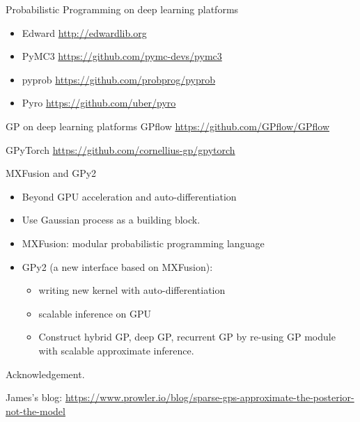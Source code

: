 \documentclass[14pt,aspectratio=1610]{beamer}
\begin{document}
\begin{frame}{Probabilistic Programming on deep learning platforms}

\begin{itemize}
\item Edward \url{http://edwardlib.org}
\item PyMC3 \url{https://github.com/pymc-devs/pymc3}
\item pyprob \url{https://github.com/probprog/pyprob}
\item Pyro \url{https://github.com/uber/pyro}
\end{itemize}

\end{frame}

\begin{frame}{GP on deep learning platforms}
GPflow \url{https://github.com/GPflow/GPflow}

GPyTorch \url{https://github.com/cornellius-gp/gpytorch}
\end{frame}



\begin{frame}{MXFusion and GPy2}
\begin{itemize}
\item Beyond GPU acceleration and auto-differentiation
\item Use Gaussian process as a building block.
\item MXFusion: modular probabilistic programming language 
\item GPy2 (a new interface based on MXFusion): 
\begin{itemize}
\item writing new kernel with auto-differentiation
\item scalable inference on GPU
\item Construct hybrid GP, deep GP, recurrent GP by re-using GP module with scalable approximate inference.
\end{itemize}
\end{itemize}
\end{frame}

\begin{frame}{}

Acknowledgement. 

James's blog: \url{https://www.prowler.io/blog/sparse-gps-approximate-the-posterior-not-the-model}
\end{frame}


{\footnotesize

}
%
\end{document}
